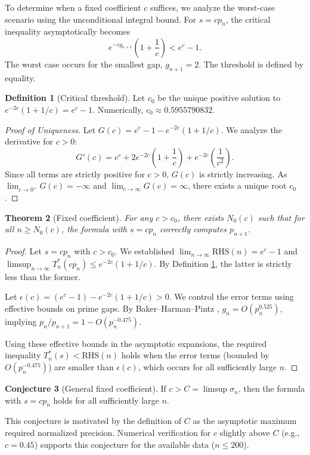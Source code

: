 \documentclass[12pt]{article}
\theoremstyle{plain}
\newtheorem{theorem}{Theorem}
\theoremstyle{definition}
\newtheorem{definition}[theorem]{Definition}
\newtheorem{conjecture}[theorem]{Conjecture}
\theoremstyle{remark}
\begin{document}
To determine when a fixed coefficient $c$ suffices, we analyze the worst-case scenario using the unconditional integral bound. For $s = cp_n$, the critical inequality asymptotically becomes
\[
e^{-cg_{n+1}} \left(1 + \frac{1}{c}\right) < e^c - 1.
\]
The worst case occurs for the smallest gap, $g_{n+1} = 2$. The threshold is defined by equality.

\begin{definition}[Critical threshold]
\label{def:c0}
Let $c_0$ be the unique positive solution to $e^{-2c}(1 + 1/c) = e^c - 1$.
Numerically, $c_0 \approx 0.5955790832$.
\end{definition}
\begin{proof}[Proof of Uniqueness]
Let $G(c) = e^c - 1 - e^{-2c}(1 + 1/c)$. We analyze the derivative for $c>0$:
\[
G'(c) = e^c + 2e^{-2c}\left(1 + \frac{1}{c}\right) + e^{-2c}\left(\frac{1}{c^2}\right).
\]
Since all terms are strictly positive for $c>0$, $G(c)$ is strictly increasing. As $\lim_{c\to 0^+} G(c) = -\infty$ and $\lim_{c\to \infty} G(c) = \infty$, there exists a unique root $c_0$.
\end{proof}

\begin{theorem}[Fixed coefficient]
\label{thm:fixed}
For any $c > c_0$, there exists $N_0(c)$ such that for all $n \geq N_0(c)$, the formula with $s=cp_n$ correctly computes $p_{n+1}$.
\end{theorem}

\begin{proof}
Let $s = cp_n$ with $c > c_0$. We established $\lim_{n\to\infty} \text{RHS}(n) = e^c - 1$ and $\limsup_{n\to\infty} T_n^*(cp_n) \leq e^{-2c}(1+1/c)$. By Definition \ref{def:c0}, the latter is strictly less than the former.

Let $\epsilon(c) = (e^c - 1) - e^{-2c}(1+1/c) > 0$. We control the error terms using effective bounds on prime gaps. By Baker--Harman--Pintz \cite{BakerHarmanPintz2001}, $g_n = O(p_n^{0.525})$, implying $p_n/p_{n+1} = 1 - O(p_n^{-0.475})$.

Using these effective bounds in the asymptotic expansions, the required inequality $T_n^*(s) < \text{RHS}(n)$ holds when the error terms (bounded by $O(p_n^{-0.475})$) are smaller than $\epsilon(c)$, which occurs for all sufficiently large $n$.
\end{proof}

\begin{conjecture}[General fixed coefficient]
\label{conj:general}
If $c > C = \limsup \sigma_n$, then the formula with $s = cp_n$ holds for all sufficiently large $n$.
\end{conjecture}
This conjecture is motivated by the definition of $C$ as the asymptotic maximum required normalized precision. Numerical verification for $c$ slightly above $C$ (e.g., $c=0.45$) supports this conjecture for the available data ($n \leq 200$).
\end{document}
